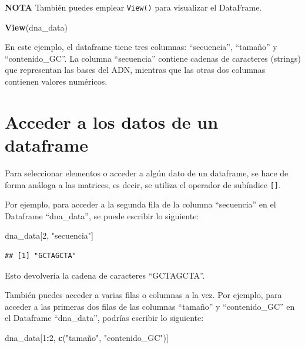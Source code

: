 \documentclass[
]{book}
\newenvironment{Shaded}{\begin{snugshade}}{\end{snugshade}}
\newcommand{\DecValTok}[1]{\textcolor[rgb]{0.00,0.00,0.81}{#1}}
\newcommand{\FunctionTok}[1]{\textcolor[rgb]{0.13,0.29,0.53}{\textbf{#1}}}
\newcommand{\NormalTok}[1]{#1}
\newcommand{\SpecialCharTok}[1]{\textcolor[rgb]{0.81,0.36,0.00}{\textbf{#1}}}
\newcommand{\StringTok}[1]{\textcolor[rgb]{0.31,0.60,0.02}{#1}}
\begin{document}
\textbf{NOTA} También puedes emplear \texttt{View()} para visualizar el DataFrame.

\begin{Shaded}
\begin{Highlighting}[]
\FunctionTok{View}\NormalTok{(dna\_data)}
\end{Highlighting}
\end{Shaded}

En este ejemplo, el dataframe tiene tres columnas: ``secuencia'', ``tamaño'' y ``contenido\_GC''. La columna ``secuencia'' contiene cadenas de caracteres (strings) que representan las bases del ADN, mientras que las otras dos columnas contienen valores numéricos.

\hypertarget{acceder-a-los-datos-de-un-dataframe}{%
\section{Acceder a los datos de un dataframe}\label{acceder-a-los-datos-de-un-dataframe}}

Para seleccionar elementos o acceder a algún dato de un dataframe, se hace de forma análoga a las matrices, es decir, se utiliza el operador de subíndice \texttt{{[}{]}}.

Por ejemplo, para acceder a la segunda fila de la columna ``secuencia'' en el Dataframe ``dna\_data'', se puede escribir lo siguiente:

\begin{Shaded}
\begin{Highlighting}[]
\NormalTok{dna\_data[}\DecValTok{2}\NormalTok{, }\StringTok{"secuencia"}\NormalTok{]}
\end{Highlighting}
\end{Shaded}

\begin{verbatim}
## [1] "GCTAGCTA"
\end{verbatim}

Esto devolvería la cadena de caracteres ``GCTAGCTA''.

También puedes acceder a varias filas o columnas a la vez.
Por ejemplo, para acceder a las primeras dos filas de las columnas ``tamaño'' y ``contenido\_GC'' en el Dataframe ``dna\_data'', podrías escribir lo siguiente:

\begin{Shaded}
\begin{Highlighting}[]
\NormalTok{dna\_data[}\DecValTok{1}\SpecialCharTok{:}\DecValTok{2}\NormalTok{, }\FunctionTok{c}\NormalTok{(}\StringTok{"tamaño"}\NormalTok{, }\StringTok{"contenido\_GC"}\NormalTok{)]}
\end{Highlighting}
\end{Shaded}
\end{document}
